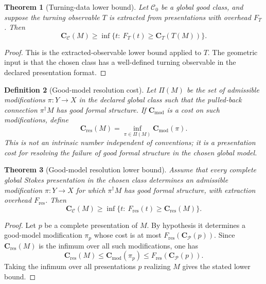 \documentclass[11pt]{article}
\newtheorem{theorem}{Theorem}[section]
\newtheorem{definition}[theorem]{Definition}
\begin{document}
\begin{theorem}[Turning-data lower bound]
Let \(\mathcal C_0\) be a global good class, and suppose the turning observable \(T\) is extracted from presentations with overhead \(F_T\).  Then
\[
\mathbf C_{\mathcal C}(M)
\ge
\inf\{t:\ F_T(t)\ge \mathbf C_T(T(M))\}.
\]
\end{theorem}

\begin{proof}
This is the extracted-observable lower bound applied to \(T\).  The geometric input is that the chosen class has a well-defined turning observable in the declared presentation format.
\end{proof}

\begin{definition}[Good-model resolution cost]
Let \(\Pi(M)\) be the set of admissible modifications \(\pi:Y\to X\) in the declared global class such that the pulled-back connection \(\pi^\dagger M\) has good formal structure.  If \(\mathbf C_{\operatorname{mod}}\) is a cost on such modifications, define
\[
\mathbf C_{\operatorname{res}}(M)
=
\inf_{\pi\in\Pi(M)}\mathbf C_{\operatorname{mod}}(\pi).
\]
This is not an intrinsic number independent of conventions; it is a presentation cost for resolving the failure of good formal structure in the chosen global model.
\end{definition}

\begin{theorem}[Good-model resolution lower bound]
Assume that every complete global Stokes presentation in the chosen class determines an admissible modification \(\pi:Y\to X\) for which \(\pi^\dagger M\) has good formal structure, with extraction overhead \(F_{\operatorname{res}}\).  Then
\[
\mathbf C_{\mathcal C}(M)
\ge
\inf\{t:\ F_{\operatorname{res}}(t)\ge \mathbf C_{\operatorname{res}}(M)\}.
\]
\end{theorem}

\begin{proof}
Let \(p\) be a complete presentation of \(M\).  By hypothesis it determines a good-model modification \(\pi_p\) whose cost is at most \(F_{\operatorname{res}}(\mathbf C_{\mathcal P}(p))\).  Since \(\mathbf C_{\operatorname{res}}(M)\) is the infimum over all such modifications, one has
\[
\mathbf C_{\operatorname{res}}(M)
\le
\mathbf C_{\operatorname{mod}}(\pi_p)
\le
F_{\operatorname{res}}(\mathbf C_{\mathcal P}(p)).
\]
Taking the infimum over all presentations \(p\) realizing \(M\) gives the stated lower bound.
\end{proof}
\end{document}
